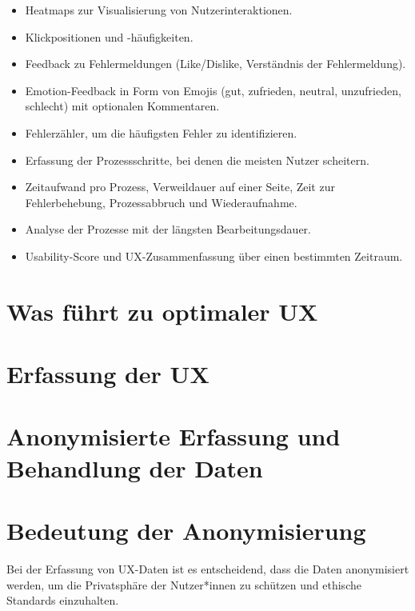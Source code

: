 \documentclass[12pt,oneside]{article}
\begin{document}
\begin{itemize} \item Heatmaps zur Visualisierung von Nutzerinteraktionen. \item Klickpositionen und -häufigkeiten. \item Feedback zu Fehlermeldungen (Like/Dislike, Verständnis der Fehlermeldung). \item Emotion-Feedback in Form von Emojis (gut, zufrieden, neutral, unzufrieden, schlecht) mit optionalen Kommentaren. \item Fehlerzähler, um die häufigsten Fehler zu identifizieren. \item Erfassung der Prozessschritte, bei denen die meisten Nutzer scheitern. \item Zeitaufwand pro Prozess, Verweildauer auf einer Seite, Zeit zur Fehlerbehebung, Prozessabbruch und Wiederaufnahme. \item Analyse der Prozesse mit der längsten Bearbeitungsdauer. \item Usability-Score und UX-Zusammenfassung über einen bestimmten Zeitraum. \end{itemize}
 

 
\section{Was führt zu optimaler UX}
 
\section{Erfassung der UX}
\section{Anonymisierte Erfassung und Behandlung der Daten}
\section{Bedeutung der Anonymisierung}
Bei der Erfassung von UX-Daten ist es entscheidend, dass die Daten anonymisiert werden, um die Privatsphäre der Nutzer*innen zu schützen und ethische Standards einzuhalten.
\end{document}

